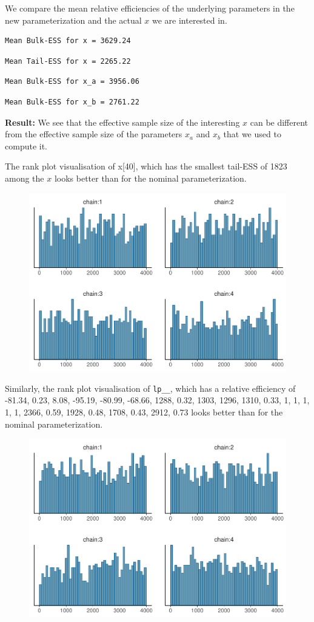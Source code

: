 \documentclass[american,]{article}
\begin{document}
We compare the mean relative efficiencies of the underlying parameters
in the new parameterization and the actual \(x\) we are interested in.

\begin{verbatim}
Mean Bulk-ESS for x = 3629.24
\end{verbatim}

\begin{verbatim}
Mean Tail-ESS for x = 2265.22
\end{verbatim}

\begin{verbatim}
Mean Bulk-ESS for x_a = 3956.06
\end{verbatim}

\begin{verbatim}
Mean Bulk-ESS for x_b = 2761.22
\end{verbatim}

\textbf{Result:} We see that the effective sample size of the
interesting \(x\) can be different from the effective sample size of the
parameters \(x_a\) and \(x_b\) that we used to compute it.

The rank plot visualisation of x{[}40{]}, which has the smallest
tail-ESS of 1823 among the \(x\) looks better than for the nominal
parameterization.

\begin{figure}[tp]
  \centering
  \includegraphics[width=0.6\linewidth]{graphics/hist-fit-alt1-2-1.pdf}
\end{figure}

Similarly, the rank plot visualisation of \texttt{lp\_\_}, which has a
relative efficiency of -81.34, 0.23, 8.08, -95.19, -80.99, -68.66, 1288,
0.32, 1303, 1296, 1310, 0.33, 1, 1, 1, 1, 1, 2366, 0.59, 1928, 0.48,
1708, 0.43, 2912, 0.73 looks better than for the nominal
parameterization.

\begin{figure}[tp]
  \centering
  \includegraphics[width=0.6\linewidth]{graphics/hist-fit-alt1-lp-1.pdf}
\end{figure}
\end{document}
